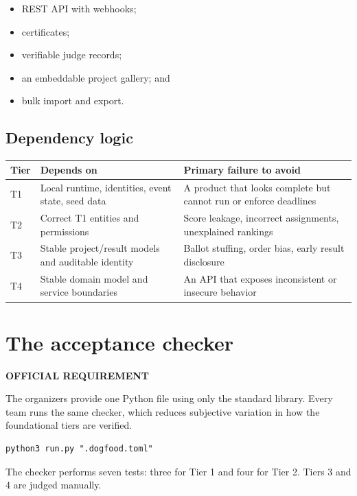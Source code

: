 \documentclass[11pt]{article}
\newcommand{\official}{\textcolor{Electric!60!black}{\textbf{OFFICIAL REQUIREMENT}}}
\begin{document}
\begin{itemize}
  \item REST API with webhooks;
  \item certificates;
  \item verifiable judge records;
  \item an embeddable project gallery; and
  \item bulk import and export.
\end{itemize}

\subsection{Dependency logic}

\begin{tabularx}{\linewidth}{@{}L{27mm}Y Y@{}}
\toprule
\textbf{Tier} & \textbf{Depends on} & \textbf{Primary failure to avoid}\\
\midrule
T1 & Local runtime, identities, event state, seed data & A product that looks complete but cannot run or enforce deadlines\\
T2 & Correct T1 entities and permissions & Score leakage, incorrect assignments, unexplained rankings\\
T3 & Stable project/result models and auditable identity & Ballot stuffing, order bias, early result disclosure\\
T4 & Stable domain model and service boundaries & An API that exposes inconsistent or insecure behavior\\
\bottomrule
\end{tabularx}

\section{The acceptance checker}

\official\par


The organizers provide one Python file using only the standard library. Every team runs the same checker, which reduces subjective variation in how the foundational tiers are verified.

\begin{lstlisting}[style=dogfood]
python3 run.py ".dogfood.toml"
\end{lstlisting}

The checker performs seven tests: three for Tier 1 and four for Tier 2. Tiers 3 and 4 are judged manually.
\end{document}
